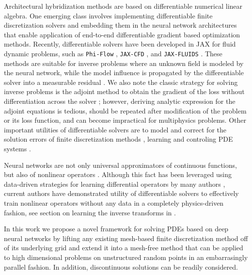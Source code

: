 \documentclass{article}
\begin{document}
Architectural hybridization methods are based on differentiable numerical linear algebra. One emerging class involves implementing differentiable finite discretization solvers and embedding them in the neural network architectures that enable application of end-to-end differentiable gradient based optimization methods. Recently, differentiable solvers have been developed in JAX \cite{jax2018github} for fluid dynamic problems, such as \texttt{Phi-Flow} \cite{holl2020phiflow}, \texttt{JAX-CFD} \cite{Kochkov2021-ML-CFD}, and \texttt{JAX-FLUIDS} \cite{bezgin2022jax}. These methods are suitable for inverse problems where an unknown field is modeled by the neural network, while the model influence is propagated by the differentiable solver into a measurable residual \cite{pakravan2021solving,dal2020data,lu2020extracting}. We also note the classic strategy for solving inverse problems is the adjoint method to obtain the gradient of the loss without differentiation across the solver \cite{berg2017neural}; however, deriving analytic expression for the adjoint equations is tedious, should be repeated after modification of the problem or its loss function, and can become impractical for multiphysics problems. Other important utilities of differentiable solvers are to model and correct for the solution errors of finite discretization methods \cite{um2020solver}, learning and controling PDE systems \cite{de2018end,holl2020learning}.

Neural networks are not only universal approximators of continuous functions, but also of nonlinear operators \cite{chen1995universal}. Although this fact has been leveraged using data-driven strategies for learning differential operators by many authors \cite{lu2019deeponet,bhattacharya2020model,li2020neural,li2020fourier}, current authors have demonstrated utility of differentiable solvers to effectively train nonlinear operators without any data in a completely physics-driven fashion, see section on learning the inverse transforms in \cite{pakravan2021solving}.

In this work we propose a novel framework for solving PDEs based on deep neural networks by lifting any existing mesh-based finite discretization method off of its underlying grid and extend it into a mesh-free method that can be applied to high dimensional problems on unstructured random points in an embarrasingly parallel fashion. In addition, discontinuous solutions can be readily considered.
\end{document}
